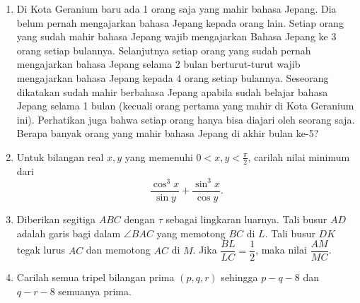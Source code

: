 \documentclass[12pt]{scrartcl}
\begin{document}
\begin{enumerate}[resume]
		\item Di Kota Geranium baru ada 1 orang saja yang mahir bahasa Jepang. Dia belum pernah mengajarkan bahasa Jepang kepada orang lain. Setiap orang yang sudah mahir bahasa Jepang wajib mengajarkan Bahasa Jepang ke 3 orang setiap bulannya. Selanjutnya setiap orang yang sudah pernah mengajarkan bahasa Jepang selama 2 bulan berturut-turut wajib mengajarkan bahasa Jepang kepada 4 orang setiap bulannya. Seseorang dikatakan sudah mahir berbahasa Jepang apabila sudah belajar bahasa Jepang selama 1 bulan (kecuali orang pertama yang mahir di Kota Geranium ini). Perhatikan juga bahwa setiap orang hanya bisa diajari oleh seorang saja. Berapa banyak orang yang mahir bahasa Jepang di akhir bulan ke-5?
		
		\item Untuk bilangan real $x,y$ yang memenuhi $0 < x,y < \frac{\pi}{2}$, carilah nilai minimum dari $$\frac{\cos^3 x}{\sin y}+\frac{\sin^3 x}{\cos y}.$$
		
		\item Diberikan segitiga $ABC$ dengan $\tau$ sebagai lingkaran luarnya. Tali busur $AD$ adalah garis bagi dalam $\angle BAC$ yang memotong $BC$ di $L$. Tali busur $DK$ tegak lurus $AC$ dan memotong $AC$ di $M$. Jika $\dfrac{BL}{LC}=\dfrac12$, maka nilai $\dfrac{AM}{MC}$.
		
		\item Carilah semua tripel bilangan prima $(p,q,r)$ sehingga $p-q-8$ dan $q-r-8$ semuanya prima.
\end{enumerate}
\end{document}
